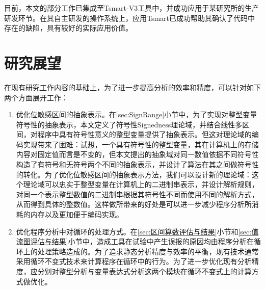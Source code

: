 目前，本文的部分工作已集成至Tsmart-V3工具中，并成功应用于某研究所的生产研发环节。在其自主研发的操作系统上，应用Tsmart已成功帮助其确认了代码中存在的缺陷，具有较好的实际应用价值。

\section{研究展望}

在现有研究工作内容的基础上，为了进一步提高分析的效率和精度，可以针对如下两个方面展开工作：

\begin{enumerate}
	\item 优化位敏感区间的抽象表示。在\ref{sec:SignRange}小节中，为了实现对整型变量符号性的抽象表示，本文定义了符号性Signedness理论域，并结合线性多区间，对程序中具有符号性意义的整型变量提供了抽象表示。但这对理论域的编码实现带来了困难：试想，一个具有符号性的整型变量，其在计算机上的存储内容对固定值而言是不变的，但本文提出的抽象域对同一数值依据不同符号性构造了有符号和无符号两个不同的抽象表示，并设计了算法在其之间做符号性的转化。为了优化位敏感区间的抽象表示方法，我们可以设计新的理论域：这个理论域可以忠实于整型变量在计算机上的二进制串表示，并设计解析规则，对同一个表示整型数值的二进制串根据其符号性不同而使用不同的解析方式，从而得到具体的整数值。这样做所带来的好处是可以进一步减少程序分析所消耗的内存以及更加便于编码实现。
	
	\item 优化程序分析中对循环的处理方式。在\ref{sec:区间算数评估与结果}小节和\ref{sec:值流图评估与结果}小节中，造成工具在试验中产生误报的原因均由程序分析在循环上的处理策略造成的。为了追求静态分析精度与效率的平衡，现有技术通常采用循环不变式技术来计算程序在循环中的行为。为了进一步优化现有分析精度，应分别对整型分析与变量表达式分析这两个模块在循环不变式上的计算方式做优化。
\end{enumerate}


